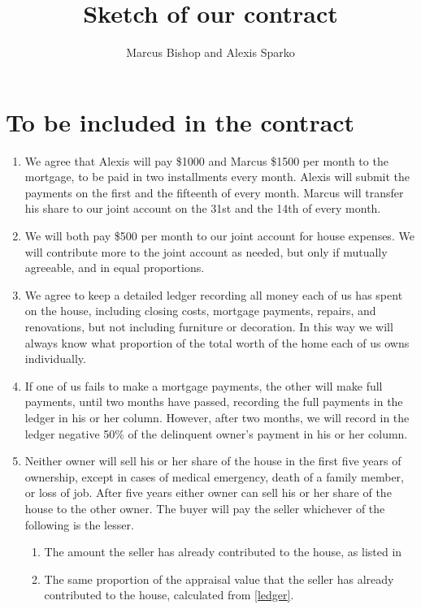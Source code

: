\documentclass[12pt]{article}
\title{Sketch of our contract}
\author{Marcus Bishop and Alexis Sparko}
\begin{document}
\maketitle

\section{To be included in the contract}
\begin{enumerate}

\item We agree that Alexis will pay \$1000 and Marcus \$1500 per month to the
mortgage, to be paid in two installments every month.
Alexis will submit the payments on the first and the fifteenth
of every month. Marcus will transfer his share to our joint account
on the 31st and the 14th of every month.

\item We will both pay \$500 per month to our joint account
for house expenses. We will contribute more to the joint
account as needed, but only if mutually agreeable,
and in equal proportions.

\item\label{ledger}
We agree to keep a detailed ledger recording all money each of
us has spent on the house, including closing costs, mortgage payments,
repairs, and renovations, but not including furniture or decoration.
In this way we will always know
what proportion of the total worth of the home
each of us owns individually.

\item If one of us fails to make a mortgage payments, the other
will make full payments, until two months have passed, recording
the full payments in the ledger in his or her column. However, after two
months, we will record in the ledger negative 50\% of the delinquent
owner's payment in his or her column.

\item Neither owner will sell his or her share of the house
in the first five years of ownership, except in cases of
medical emergency, death of a family member, or loss of job.
After five years either owner can sell his or her share of the
house to the other owner. The buyer will pay the seller
whichever of the following is the lesser.
\begin{enumerate}
\item The amount the seller has already contributed to the house,
as listed in 
\item The same proportion of the appraisal value that the seller
has already contributed to the house, calculated from \autoref{ledger}.
\end{enumerate}
\end{enumerate}
\end{document}
